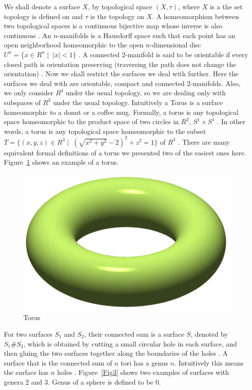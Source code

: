 \documentclass{article}
\begin{document}
    We shall denote a surface $X$, by topological space $(X, \tau)$, where $X$ is a the set topology is defined on and $\tau$ is the topology on $X$. 
    A homeomorphism between two topological spaces is a continuous bijective map whose inverse is also continuous \cite{Munkres00}.
    An $n$-manifolds is a Hausdorff space such that each point has an open neighborhood homeomorphic to the open $n$-dimensional disc $U^n =  \{x \in R^n\mid \; |x| < 1\}$ \cite{Massey91}.
    A connected $2$-manifold is said to be orientable if every closed path is orientation preserving (traversing the path does not change the orientation) \cite{Massey91}.
    Now we shall restrict the surfaces we deal with further. Here the surfaces we deal with are orientable, compact and connected $2$-manifolds.
    Also, we only consider $R^3$ under the usual topology, so we are dealing only with subspaces of $R^3$ under the usual topology.
    Intuitively a Torus is a surface homeomorphic to a donut or a coffee mug. Formally, a torus is any topological space homeomorphic to the product space of two circles in $R^2$, $S^1 \times S^1$ \cite{Massey91}. 
    In other words, a torus is any topological space homeomorphic to the subset $T = \{(x, y, z)\in R^3\mid \; (\sqrt{x^2 + y^2} - 2)^2 + z^2 = 1 \}$ of $R^3$ \cite{Massey91}. There are many equivalent formal definitions of a torus we presented two of the easiest ones here.
    Figure~\ref*{Fig2} shows an example of a torus.
    \begin{figure}[h]
        \centering
        \includegraphics[scale = 1]{Torus_illustration.png} 
        \caption{Torus}
        \label{Fig2}
    \end{figure}
    For two surfaces $S_1$ and $S_2$, their connected sum is a surface $S$, denoted by $S_1 \# S_2$, which is obtained by cutting a small circular hole in each surface, and then gluing the two surfaces together along the boundaries of the holes \cite{Massey91}.
    A surface that is the connected sum of $n$ tori has a genus $n$. Intuitively this means the surface has $n$ holes \cite{Massey91}. Figure~\ref{Fig3} shows two examples of surfaces with genera 2 and 3. Genus of a sphere is defined to be 0.
\end{document}
